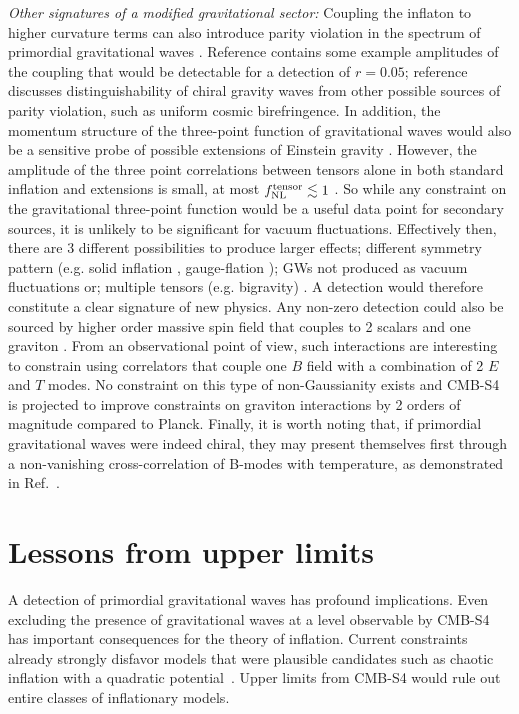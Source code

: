 {\it Other signatures of a modified gravitational sector:} Coupling the inflaton to higher curvature terms can also introduce parity violation in the spectrum of primordial gravitational waves \cite{lue99,Alexander:2004wk,Contaldi:2008yz,Takahashi:2009wc}. Reference \cite{Takahashi:2009wc} contains some example amplitudes of the coupling that would be detectable for a detection of $r=0.05$; reference \cite{2010PhRvD..81l3529G} discusses distinguishability of chiral gravity waves from other possible sources of parity violation, such as uniform cosmic birefringence. In addition, the momentum structure of the three-point function of gravitational waves would also be a sensitive probe of possible extensions of Einstein gravity \cite{Maldacena:2011nz}. However, the amplitude of the three point correlations between tensors alone in both standard inflation and extensions is small, at most $f^{\rm tensor}_{\rm NL}\lesssim 1$ \cite{Maldacena:2002vr,Maldacena:2011nz}. So while any constraint on the gravitational three-point function would be a useful data point for secondary sources, it is unlikely to be significant for vacuum fluctuations. Effectively then, there are 3 different possibilities to produce larger effects; different symmetry pattern (e.g. solid inflation \cite{2013JCAP...10..011E}, gauge-flation \cite{Maleknejad:2011jw}); GWs not produced as vacuum fluctuations or; multiple tensors (e.g. bigravity) \cite{2016arXiv160508424B}. A detection would therefore constitute a clear signature of new physics. Any non-zero detection could also be sourced by higher order massive spin field that couples to 2 scalars and one graviton \cite{2016JCAP...02..017D}. From an observational point of view, such interactions are interesting to constrain using correlators that couple one $B$ field with a combination of 2 $E$ and $T$ modes. No constraint on this type of non-Gaussianity exists and CMB-S4 is projected to improve constraints on graviton interactions by 2 orders of magnitude \cite{Meerburg2016} compared to Planck.  
Finally, it is worth noting that, if primordial gravitational waves were indeed chiral, they may present themselves first through a non-vanishing cross-correlation of B-modes with temperature, as demonstrated in Ref.~\cite{Contaldi:2008yz}.


\section{Lessons from upper limits} 
\label{sec:upperLimits}
A detection of primordial gravitational waves has profound implications. Even excluding the presence of gravitational waves at a level observable by CMB-S4 has important consequences for the theory of inflation. Current constraints already strongly disfavor models that were plausible candidates such as chaotic inflation with a quadratic potential~\cite{bicepkeckplanck15}. Upper limits from CMB-S4 would rule out entire classes of inflationary models. 

